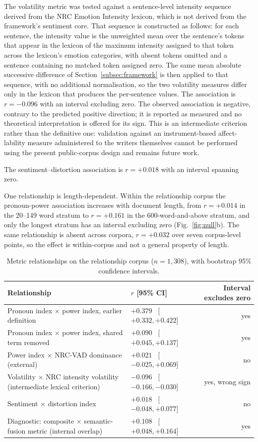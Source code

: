 \documentclass[fleqn,10pt]{wlscirep}
\providecommand{\botrule}{\bottomrule}
\begin{document}
The volatility metric was tested against a sentence-level intensity sequence derived from the NRC Emotion Intensity lexicon\cite{mohammad2018intensity}, which is not derived from the framework's sentiment core. That sequence is constructed as follows: for each sentence, the intensity value is the unweighted mean over the sentence's tokens that appear in the lexicon of the maximum intensity assigned to that token across the lexicon's emotion categories, with absent tokens omitted and a sentence containing no matched token assigned zero. The same mean absolute successive difference of Section~\ref{subsec:framework} is then applied to that sequence, with no additional normalisation, so the two volatility measures differ only in the lexicon that produces the per-sentence values. The association is $r=-0.096$ with an interval excluding zero. The observed association is negative, contrary to the predicted positive direction; it is reported as measured and no theoretical interpretation is offered for its sign. This is an intermediate criterion rather than the definitive one: validation against an instrument-based affect-lability measure administered to the writers themselves cannot be performed using the present public-corpus design and remains future work.

The sentiment--distortion association is $r=+0.018$ with an interval spanning zero.

One relationship is length-dependent. Within the relationship corpus the pronoun-power association increases with document length, from $r=+0.014$ in the 20--149 word stratum to $r=+0.161$ in the 600-word-and-above stratum, and only the longest stratum has an interval excluding zero (Fig.~\ref{fig:null}b). The same relationship is absent across corpora, $r=+0.032$ over seven corpus-level points, so the effect is within-corpus and not a general property of length.

\begin{table}[ht]
\centering
\small
\caption{Metric relationships on the relationship corpus ($n=1{,}308$), with bootstrap 95\% confidence intervals.}
\label{tab:corr}
\begin{tabular}{llr}
\toprule
Relationship & $r$ [95\% CI] & Interval excludes zero \\
\midrule
Pronoun index $\times$ power index, earlier definition & $+0.379$ \ [$+0.332, +0.422$] & yes \\
Pronoun index $\times$ power index, shared term removed & $+0.090$ \ [$+0.045, +0.137$] & yes \\
Power index $\times$ NRC-VAD dominance (external) & $+0.021$ \ [$-0.025, +0.069$] & no \\
Volatility $\times$ NRC intensity volatility (intermediate lexical criterion) & $-0.096$ \ [$-0.166, -0.030$] & yes, wrong sign \\
Sentiment $\times$ distortion index & $+0.018$ \ [$-0.048, +0.077$] & no \\
Diagnostic: composite $\times$ semantic-fusion metric (internal overlap) & $+0.108$ \ [$+0.048, +0.164$] & yes \\
\botrule
\end{tabular}
\end{table}
\end{document}
